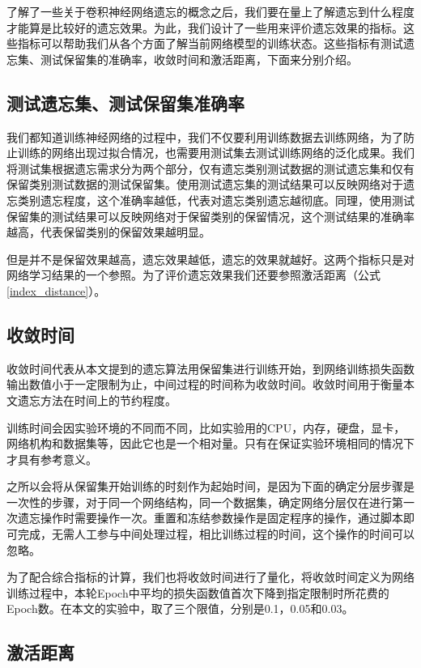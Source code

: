 了解了一些关于卷积神经网络遗忘的概念之后，我们要在量上了解遗忘到什么程度才能算是比较好的遗忘效果。为此，我们设计了一些用来评价遗忘效果的指标。这些指标可以帮助我们从各个方面了解当前网络模型的训练状态。这些指标有测试遗忘集、测试保留集的准确率，收敛时间和激活距离，下面来分别介绍。
\subsection{测试遗忘集、测试保留集准确率}

我们都知道训练神经网络的过程中，我们不仅要利用训练数据去训练网络，为了防止训练的网络出现过拟合情况，也需要用测试集去测试训练网络的泛化成果。我们将测试集根据遗忘需求分为两个部分，仅有遗忘类别测试数据的测试遗忘集和仅有保留类别测试数据的测试保留集。使用测试遗忘集的测试结果可以反映网络对于遗忘类别遗忘程度，这个准确率越低，代表对遗忘类别遗忘越彻底。同理，使用测试保留集的测试结果可以反映网络对于保留类别的保留情况，这个测试结果的准确率越高，代表保留类别的保留效果越明显。

但是并不是保留效果越高，遗忘效果越低，遗忘的效果就越好。这两个指标只是对网络学习结果的一个参照。为了评价遗忘效果我们还要参照激活距离（公式\ref{index_distance}）。

\subsection{收敛时间}

收敛时间代表从本文提到的遗忘算法用保留集进行训练开始，到网络训练损失函数输出数值小于一定限制为止，中间过程的时间称为收敛时间。收敛时间用于衡量本文遗忘方法在时间上的节约程度。

训练时间会因实验环境的不同而不同，比如实验用的CPU，内存，硬盘，显卡，网络机构和数据集等，因此它也是一个相对量。只有在保证实验环境相同的情况下才具有参考意义。

之所以会将从保留集开始训练的时刻作为起始时间，是因为下面的确定分层步骤是一次性的步骤，对于同一个网络结构，同一个数据集，确定网络分层仅在进行第一次遗忘操作时需要操作一次。重置和冻结参数操作是固定程序的操作，通过脚本即可完成，无需人工参与中间处理过程，相比训练过程的时间，这个操作的时间可以忽略。

为了配合综合指标的计算，我们也将收敛时间进行了量化，将收敛时间定义为网络训练过程中，本轮Epoch中平均的损失函数值首次下降到指定限制时所花费的Epoch数。在本文的实验中，取了三个限值，分别是0.1，0.05和0.03。

\subsection{激活距离}

